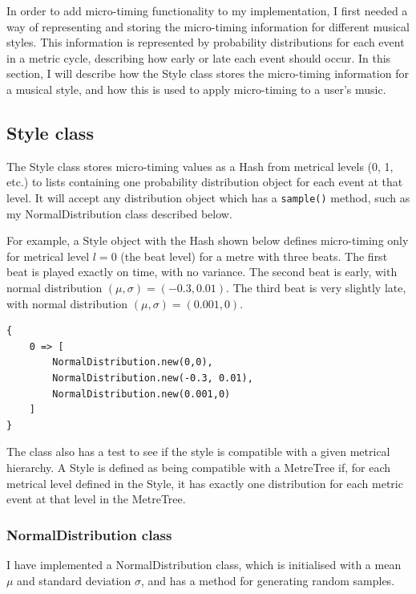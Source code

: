 \documentclass[12pt,twoside,openright]{report}
\begin{document}
In order to add micro-timing functionality to my implementation, I first needed
a way of representing and storing the micro-timing information for different
musical styles. This information is represented by probability distributions for
each event in a metric cycle, describing how early or late each event should
occur. In this section, I will describe how the
Style class stores the micro-timing information for a musical style, and how
this is used to apply micro-timing to a user's music.


\subsection{Style class} \label{style_class}

The Style class stores micro-timing values as a Hash from metrical levels (0, 1,
etc.) to lists containing one probability distribution object for each event at
that level. It will accept any distribution object which has a \verb'sample()' method,
such as my NormalDistribution class described below.

For example, a Style object with the Hash shown below defines micro-timing only for metrical level
$l=0$ (the beat level) for a metre with three beats. The first beat is played exactly on time,
with no variance. The second beat is early, with normal distribution $(\mu,\sigma)=(-0.3,0.01)$.
The third beat is very slightly late, with normal distribution $(\mu,\sigma)=(0.001,0)$.

\begin{verbatim}
{
    0 => [
        NormalDistribution.new(0,0),
        NormalDistribution.new(-0.3, 0.01),
        NormalDistribution.new(0.001,0)
    ]
}
\end{verbatim}

The class also has a test to see if the style is compatible with a given metrical
hierarchy. A Style is defined as being compatible with a MetreTree if, for each
metrical level defined in the Style, it has exactly one distribution for each
metric event at that level in the MetreTree.

\subsubsection{NormalDistribution class} \label{normal_distribution}

I have implemented a NormalDistribution class, which is initialised with a mean $\mu$ and standard deviation
$\sigma$, and has a method for generating random samples.
\end{document}
